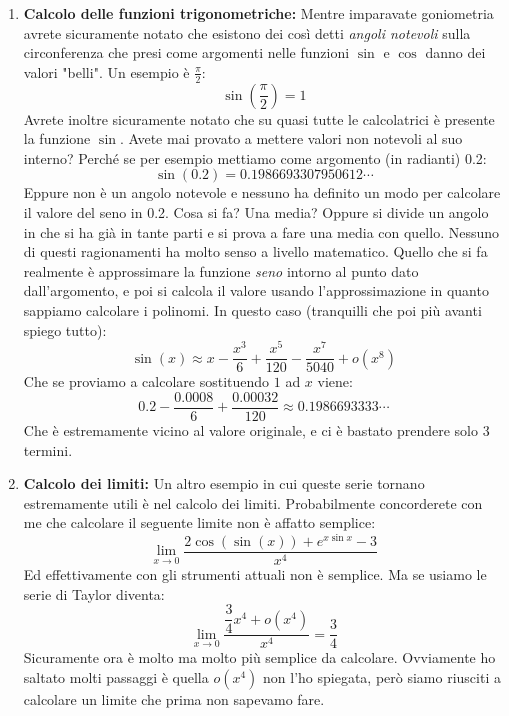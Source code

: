 \begin{enumerate}
	\item \textbf{Calcolo delle funzioni trigonometriche:} Mentre imparavate 
        goniometria avrete sicuramente notato che esistono dei così detti 
        \textit{angoli notevoli} sulla circonferenza che presi come argomenti 
        nelle funzioni $\sin$ e $\cos$ danno dei valori "belli". Un esempio è 
        $\frac{\pi}{2}$:
	\begin{equation*}
		\sin \left(\dfrac{\pi}{2}\right) = 1
	\end{equation*}
	Avrete inoltre sicuramente notato che su quasi tutte le calcolatrici è 
        presente la funzione $\sin$. Avete mai provato a mettere valori non 
        notevoli al suo interno? Perché se per esempio mettiamo come argomento 
        (in radianti) 0.2:
	\begin{equation*}
		\sin(0.2) = 0.1986693307950612\cdots 
	\end{equation*}
	Eppure non è un angolo notevole e nessuno ha definito un modo per calcolare 
        il valore del seno in 0.2. Cosa si fa? Una media? Oppure si divide un 
        angolo in che si ha già in tante parti e si prova a fare una media con 
        quello. Nessuno di questi ragionamenti ha molto senso a livello 
        matematico. Quello che si fa realmente è approssimare la funzione 
        \textit{seno} intorno al punto dato dall'argomento, e poi si calcola il 
        valore usando l'approssimazione in quanto sappiamo calcolare i 
        polinomi. In questo caso (tranquilli che poi più avanti spiego tutto):
	\begin{equation*}
		\sin(x) \approx x - \dfrac{x^3}{6} + \dfrac{x^5}{120} - 
        \dfrac{x^7}{5040} + o(x^8)
	\end{equation*}
	Che se proviamo a calcolare sostituendo $1$ ad $x$ viene:
	\begin{equation*}
		0.2 - \dfrac{0.0008}{6} + \dfrac{0.00032}{120} \approx 0.1986693333 
        \cdots
	\end{equation*}
	Che è estremamente vicino al valore originale, e ci è bastato prendere solo 
        3 termini.

	\item \textbf{Calcolo dei limiti:} Un altro esempio in cui queste serie 
        tornano estremamente utili è nel calcolo dei limiti. Probabilmente 
        concorderete con me che calcolare il seguente limite non è affatto 
        semplice:
		\begin{equation*}
			\lim_{x \to 0} \dfrac{2\cos(\sin(x)) + e^{x\sin{x}} - 3}{x^4}
		\end{equation*}
		Ed effettivamente con gli strumenti attuali non è semplice. Ma se 
        usiamo le serie di Taylor diventa:
		\begin{equation*}
			\lim_{x \to 0} \dfrac{\dfrac{3}{4} x^4 + o(x^4)}{x^4} = 
            \dfrac{3}{4}
		\end{equation*}
		Sicuramente ora è molto ma molto più semplice da calcolare. Ovviamente 
        ho saltato molti passaggi è quella $o(x^4)$ non l'ho spiegata, però 
        siamo riusciti a calcolare un limite che prima non sapevamo fare.

\end{enumerate}

